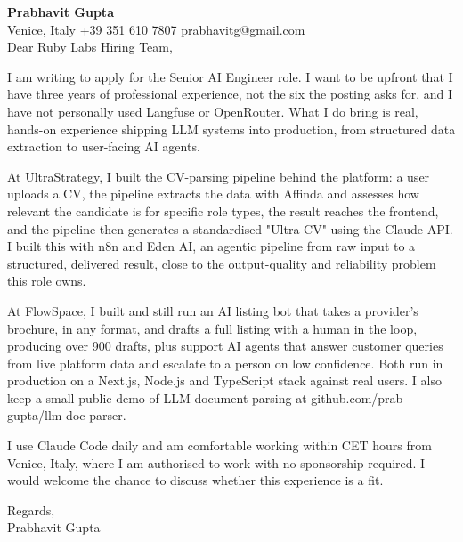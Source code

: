 \documentclass[a4paper,10.5pt]{article}
\begin{document}
\textbf{Prabhavit Gupta}\\
Venice, Italy \textbar{} +39 351 610 7807 \textbar{} prabhavitg@gmail.com\\[10pt]
Dear Ruby Labs Hiring Team,

I am writing to apply for the Senior AI Engineer role. I want to be upfront that I have three years of professional experience, not the six the posting asks for, and I have not personally used Langfuse or OpenRouter. What I do bring is real, hands-on experience shipping LLM systems into production, from structured data extraction to user-facing AI agents.

At UltraStrategy, I built the CV-parsing pipeline behind the platform: a user uploads a CV, the pipeline extracts the data with Affinda and assesses how relevant the candidate is for specific role types, the result reaches the frontend, and the pipeline then generates a standardised "Ultra CV" using the Claude API. I built this with n8n and Eden AI, an agentic pipeline from raw input to a structured, delivered result, close to the output-quality and reliability problem this role owns.

At FlowSpace, I built and still run an AI listing bot that takes a provider's brochure, in any format, and drafts a full listing with a human in the loop, producing over 900 drafts, plus support AI agents that answer customer queries from live platform data and escalate to a person on low confidence. Both run in production on a Next.js, Node.js and TypeScript stack against real users. I also keep a small public demo of LLM document parsing at github.com/prab-gupta/llm-doc-parser.

I use Claude Code daily and am comfortable working within CET hours from Venice, Italy, where I am authorised to work with no sponsorship required. I would welcome the chance to discuss whether this experience is a fit.

Regards,\\
Prabhavit Gupta
\end{document}
